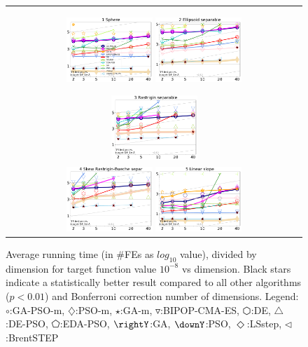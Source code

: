 \documentclass[runningheads]{llncs}
\begin{document}
\begin{figure}[h!tb]
  \begin{tabular}
      {c@{\hspace*{-0.00001\textwidth}}
      }
     
  \includegraphics[width=0.30\textwidth]{ppfigs_f001}
  \includegraphics[width=0.30\textwidth]{ppfigs_f002}

  \includegraphics[width=0.30\textwidth]{ppfigs_f003}\\
  \includegraphics[width=0.30\textwidth]{ppfigs_f004}
  
  \includegraphics[width=0.30\textwidth]{ppfigs_f005}
  \end{tabular}
  \vspace{-3ex}
   \caption{Average running time (in \#FEs as $log_{10}$ value),
    divided by dimension for target function value $10^{-8}$ vs dimension. 
    Black stars indicate a statistically better result compared to 
    all other algorithms ($p < 0.01$) and Bonferroni 
    correction number of dimensions. 
    Legend: {\color{NavyBlue}$\circ$}:GA-PSO-m, 
    {\color{Magenta}$\diamondsuit$}:PSO-m, 
    {\color{Orange}$\star$}:GA-m, 
    {\color{CornflowerBlue}$\triangledown$}:BIPOP-CMA-ES,
    {\color{red}$\varhexagon$}:DE, 
    {\color{YellowGreen}$\triangle$}:DE-PSO, 
    {\color{cyan}$\pentagon$}:EDA-PSO, 
    {\color{GreenYellow}$\rightY$}:GA, 
    {\color{ForestGreen}$\downY$}:PSO, 
    {\color{Lavender}$\Diamond$}:LSstep, 
    {\color{SkyBlue}$\triangleleft$}:BrentSTEP
    } 
  \label{fig:avg}
\end{figure}
%
\end{document}
